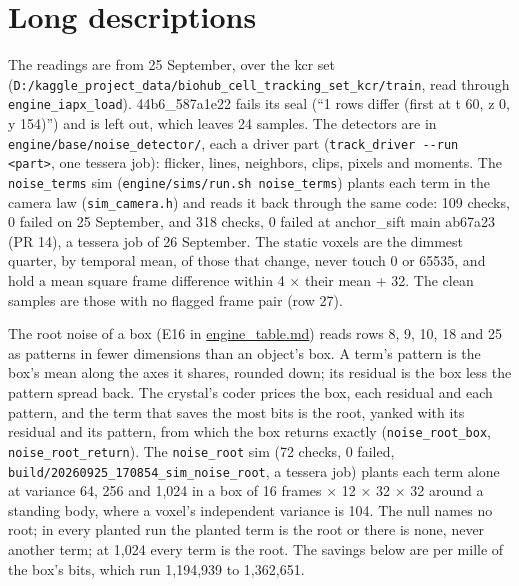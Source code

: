 \section{\texorpdfstring{Long descriptions}{Long descriptions}}

The readings are from 25 September, over the kcr set (\texttt{D:/\allowbreak{}kaggle\_\allowbreak{}project\_\allowbreak{}data/\allowbreak{}biohub\_\allowbreak{}cell\_\allowbreak{}tracking\_\allowbreak{}set\_\allowbreak{}kcr/\allowbreak{}train}, read through \texttt{engine\_\allowbreak{}iapx\_\allowbreak{}load}). 44b6\_\allowbreak{}587a1e22 fails its seal (“1 rows differ (first at t 60, z 0, y 154)”) and is left out, which leaves 24 samples. The detectors are in \texttt{engine/\allowbreak{}base/\allowbreak{}noise\_\allowbreak{}detector/\allowbreak{}}, each a driver part (\texttt{track\_\allowbreak{}driver -\allowbreak{}-\allowbreak{}run <part>}, one tessera job): flicker, lines, neighbors, clips, pixels and moments. The \texttt{noise\_\allowbreak{}terms} sim (\texttt{engine/\allowbreak{}sims/\allowbreak{}run.\allowbreak{}sh noise\_\allowbreak{}terms}) plants each term in the camera law (\texttt{sim\_\allowbreak{}camera.\allowbreak{}h}) and reads it back through the same code: 109 checks, 0 failed on 25 September, and 318 checks, 0 failed at anchor\_\allowbreak{}sift main ab67a23 (PR 14), a tessera job of 26 September. The static voxels are the dimmest quarter, by temporal mean, of those that change, never touch 0 or 65535, and hold a mean square frame difference within 4 × their mean + 32. The clean samples are those with no flagged frame pair (row 27).

The root noise of a box (E16 in \hyperref[chap:engine-table]{engine\_\allowbreak{}table.md}) reads rows 8, 9, 10, 18 and 25 as patterns in fewer dimensions than an object's box. A term's pattern is the box's mean along the axes it shares, rounded down; its residual is the box less the pattern spread back. The crystal's coder prices the box, each residual and each pattern, and the term that saves the most bits is the root, yanked with its residual and its pattern, from which the box returns exactly (\texttt{noise\_\allowbreak{}root\_\allowbreak{}box}, \texttt{noise\_\allowbreak{}root\_\allowbreak{}return}). The \texttt{noise\_\allowbreak{}root} sim (72 checks, 0 failed, \texttt{build/\allowbreak{}20260925\_\allowbreak{}170854\_\allowbreak{}sim\_\allowbreak{}noise\_\allowbreak{}root}, a tessera job) plants each term alone at variance 64, 256 and 1,024 in a box of 16 frames × 12 × 32 × 32 around a standing body, where a voxel's independent variance is 104. The null names no root; in every planted run the planted term is the root or there is none, never another term; at 1,024 every term is the root. The savings below are per mille of the box's bits, which run 1,194,939 to 1,362,651.

